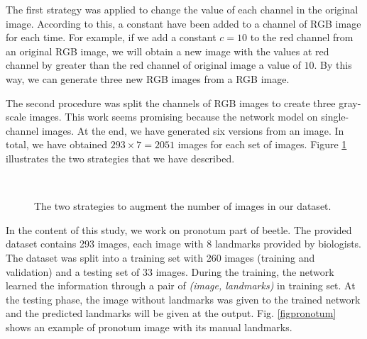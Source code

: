 \documentclass[review]{elsarticle}
\begin{document}
The first strategy was applied to change the value of each channel in the original image. According to this, a constant have been added to a channel of RGB image for each time. For example, if we add a constant $c = 10$ to the red channel from an original RGB image, we will obtain a new image with the values at red channel by greater than the red channel of original image a value of $10$. By this way, we can generate three new RGB images from a RGB image.

The second procedure was split the channels of RGB images to create three gray-scale images. This work seems promising because the network model on single-channel images. At the end, we have generated six versions from an image. In total, we have obtained $293 \times 7 = 2051$ images for each set of images. Figure \ref{figdataauge} illustrates the two strategies that we have described.

\begin{figure}[h!]
    \centering
    ~~
    \caption{The two strategies to augment the number of images in our dataset.}
    \label{figdataauge}
\end{figure}





In the content of this study, we work on pronotum part of beetle. The provided dataset contains 293 images, each image with 8 landmarks provided by biologists. The dataset was split into a training set with 260 images (training and validation) and a testing set of 33 images. During the training, the network learned the information through a pair of \textit{(image, landmarks)} in training set. At the testing phase, the image without landmarks was given to the trained network and the predicted landmarks will be given at the output. Fig. \ref{figpronotum} shows an example of pronotum image with its manual landmarks.
\end{document}
